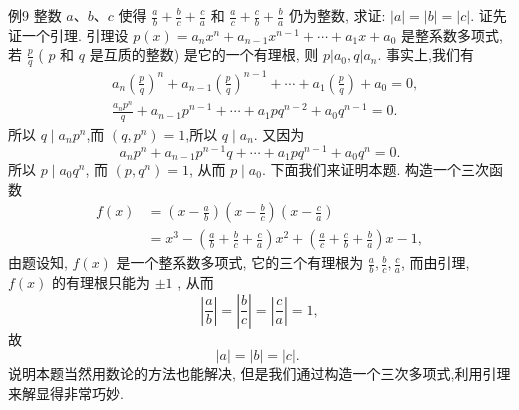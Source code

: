 例9 整数 $a 、 b 、 c$ 使得 $\frac{a}{b}+\frac{b}{c}+\frac{c}{a}$ 和 $\frac{a}{c}+\frac{c}{b}+\frac{b}{a}$ 仍为整数, 求证: $|a|=|b|=|c|$.
证先证一个引理.
引理设 $p(x)=a_n x^n+a_{n-1} x^{n-1}+\cdots+a_1 x+a_0$ 是整系数多项式, 若
$\frac{p}{q}$ ( $p$ 和 $q$ 是互质的整数) 是它的一个有理根, 则 $p\left|a_0, q\right| a_n$.
事实上,我们有
$$
\begin{aligned}
& a_n\left(\frac{p}{q}\right)^n+a_{n-1}\left(\frac{p}{q}\right)^{n-1}+\cdots+a_1\left(\frac{p}{q}\right)+a_0=0, \\
& \frac{a_n p^n}{q}+a_{n-1} p^{n-1}+\cdots+a_1 p q^{n-2}+a_0 q^{n-1}=0 .
\end{aligned}
$$
所以 $q \mid a_n p^n$,而 $\left(q, p^n\right)=1$,所以 $q \mid a_n$.
又因为
$$
a_n p^n+a_{n-1} p^{n-1} q+\cdots+a_1 p q^{n-1}+a_0 q^n=0 .
$$
所以 $p \mid a_0 q^n$, 而 $\left(p, q^n\right)=1$, 从而 $p \mid a_0$.
下面我们来证明本题.
构造一个三次函数
$$
\begin{aligned}
f(x) & =\left(x-\frac{a}{b}\right)\left(x-\frac{b}{c}\right)\left(x-\frac{c}{a}\right) \\
& =x^3-\left(\frac{a}{b}+\frac{b}{c}+\frac{c}{a}\right) x^2+\left(\frac{a}{c}+\frac{c}{b}+\frac{b}{a}\right) x-1,
\end{aligned}
$$
由题设知, $f(x)$ 是一个整系数多项式, 它的三个有理根为 $\frac{a}{b}, \frac{b}{c}, \frac{c}{a}$, 而由引理, $f(x)$ 的有理根只能为 $\pm 1$ , 从而
$$
\left|\frac{a}{b}\right|=\left|\frac{b}{c}\right|=\left|\frac{c}{a}\right|=1,
$$
故
$$
|a|=|b|=|c| \text {. }
$$
说明本题当然用数论的方法也能解决, 但是我们通过构造一个三次多项式,利用引理来解显得非常巧妙.



